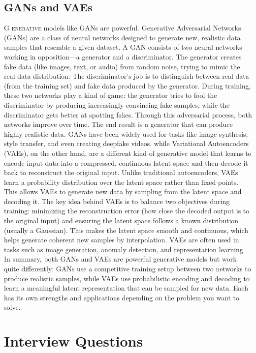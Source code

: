 \documentclass{book}
\begin{document}
\section{GANs and VAEs}
\lettrine{G}{ enerative} models like GANs are powerful. Generative Adversarial Networks (GANs) are a class of neural networks designed to generate new, realistic data samples that resemble a given dataset. A GAN consists of two neural networks working in opposition—a generator and a discriminator. The generator creates fake data (like images, text, or audio) from random noise, trying to mimic the real data distribution. The discriminator’s job is to distinguish between real data (from the training set) and fake data produced by the generator. During training, these two networks play a kind of game: the generator tries to fool the discriminator by producing increasingly convincing fake samples, while the discriminator gets better at spotting fakes. Through this adversarial process, both networks improve over time. The end result is a generator that can produce highly realistic data. GANs have been widely used for tasks like image synthesis, style transfer, and even creating deepfake videos.
while Variational Autoencoders (VAEs), on the other hand, are a different kind of generative model that learns to encode input data into a compressed, continuous latent space and then decode it back to reconstruct the original input. Unlike traditional autoencoders, VAEs learn a probability distribution over the latent space rather than fixed points. This allows VAEs to generate new data by sampling from the latent space and decoding it. The key idea behind VAEs is to balance two objectives during training: minimizing the reconstruction error (how close the decoded output is to the original input) and ensuring the latent space follows a known distribution (usually a Gaussian). This makes the latent space smooth and continuous, which helps generate coherent new samples by interpolation. VAEs are often used in tasks such as image generation, anomaly detection, and representation learning. In summary, both GANs and VAEs are powerful generative models but work quite differently: GANs use a competitive training setup between two networks to produce realistic samples, while VAEs use probabilistic encoding and decoding to learn a meaningful latent representation that can be sampled for new data. Each has its own strengths and applications depending on the problem you want to solve.

\chapter{Interview Questions}
\end{document}
